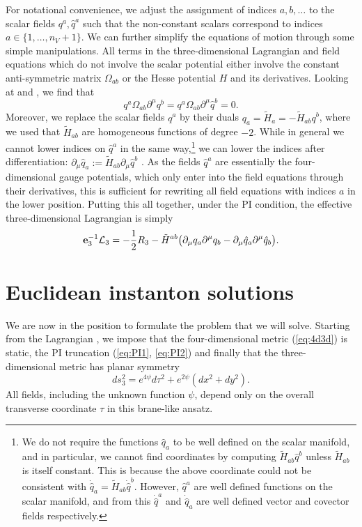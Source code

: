 For notational convenience, we adjust the assignment of indices $a,b,\dots$ to the scalar fields $q^a, \hat{q}^a$ such that the non-constant scalars correspond to indices $a \in \{1, \ldots, n_V+1 \}$. We can further simplify the equations of motion through some simple manipulations. All terms in the three-dimensional Lagrangian and field equations which do not involve the scalar potential either involve the constant anti-symmetric matrix $\Omega_{ab}$ or the Hesse potential $H$ and its derivatives. Looking at  and , we find that 
 \begin{equation*}
 	q^a \Omega_{ab} \partial^\mu q^b = q^a \Omega_{ab} \partial^\mu \hat{q}^b = 0 .
 \end{equation*}
 Moreover, we replace the scalar fields $q^a$ by their duals $q_a = \tilde{H}_a = -\tilde{H}_{ab} q^b$, where we used that $\tilde{H}_{ab}$ are homogeneous functions of degree $-2$. While in general we cannot lower indices on $\hat{q}^a$ in the same way,\footnote{We do not require the functions $\hat{q}_a$ to be well defined on the scalar manifold, and in particular, we cannot find coordinates by computing $\tilde{H}_{ab} \hat{q}^b$ unless $\tilde{H}_{ab}$ is itself constant. This is because the above coordinate could not be consistent with $\dot{\hat{q}}_a = \tilde{H}_{ab} \dot{\hat{q}}^b$. However, $\hat{q}^a$ are well defined functions on the scalar manifold, and from this $\dot{\hat{q}}^a$ and $\dot{\hat{q}}_a$ are well defined vector and covector fields respectively.} we can lower the indices after differentiation: $\partial_\mu \hat{q}_a := \tilde{H}_{ab} \partial_\mu \hat{q}^b$ \cite{Errington:2014bta}. As the fields $\hat{q}^a$ are essentially the four-dimensional gauge potentials, which only enter into the field equations through their derivatives, this is sufficient for rewriting all field equations with indices $a$ in the lower position. Putting this all together, under the PI condition, the effective three-dimensional Lagrangian is simply
\begin{equation}
\label{eq:effective3slag}
 \mathbf{e}_3^{-1} {\cal L}_3 = -\frac{1}{2}R_3 - \tilde{H}^{ab}\big(\partial_\mu q_a\partial^\mu q_b -  \partial_\mu \hat{q}_a \partial^\mu \hat{q}_b \big).
\end{equation}


\section{Euclidean instanton solutions}
\label{sec:stueucinstanton}
 We are now in the position to formulate the problem that we will solve. Starting from the Lagrangian , we impose that the four-dimensional metric (\ref{eq:4d3d}) is static, the PI truncation (\ref{eq:PI1}, \ref{eq:PI2}) and finally that the three-dimensional metric has planar symmetry
	\begin{equation}
	\label{eq:3dplanaransatz}
	ds_3^2 = e^{4\psi} d\tau^2 + e^{2\psi} (dx^2 + dy^2).
	\end{equation}
	All fields, including the unknown function $\psi$, depend only on the overall transverse coordinate $\tau$ in this brane-like ansatz.

